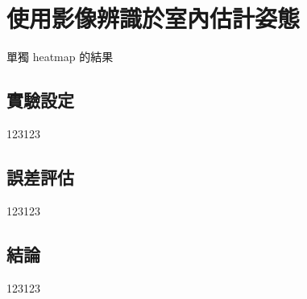 
\section{使用影像辨識於室內估計姿態}
單獨 heatmap 的結果
\subsection{實驗設定}
123123
\subsection{誤差評估}
123123
\subsection{結論}
123123

